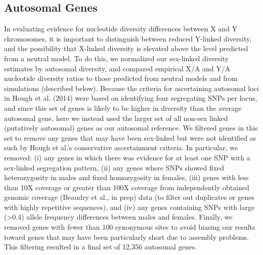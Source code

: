 \documentclass[9pt,twocolumn,twoside]{gsajnl}
\begin{document}
\subsection*{Autosomal Genes}
In evaluating evidence for nucleotide diversity differences between X and Y chromosomes, it is important to distinguish between reduced Y-linked diversity, and the possibility that X-linked diversity is elevated above the level predicted from a neutral model. To do this, we normalized our sex-linked diversity estimates by autosomal diversity, and compared empirical X/A and Y/A nucleotide diversity ratios to those predicted from neutral models and from simulations (described below). Because the criteria for ascertaining autosomal loci in Hough et al. (2014) were based on identifying four segregating SNPs per locus, and since this set of genes is likely to be higher in diversity than the average autosomal gene, here we instead used the larger set of all non-sex linked (putatively autosomal) genes as our autosomal reference. We filtered genes in this set to remove any genes that may have been sex-linked but were not identified as such by Hough et al.'s conservative ascertainment criteria. In particular, we removed: (i) any genes in which there was evidence for at least one SNP with a sex-linked segregation pattern, (ii) any genes where SNPs showed fixed heterozygosity in males and fixed homozygosity in females, (iii) genes with less than 10X coverage or greater than 100X coverage from independently obtained genomic coverage (Beaudry et al., in prep) data (to filter out duplicates or genes with highly repetitive sequences), and (iv) any genes containing SNPs with large (>0.4) allele frequency differences between males and females. Finally, we removed genes with fewer than 100 synonymous sites to avoid biasing our results toward genes that may have been particularly short due to assembly problems. This filtering resulted in a final set of 12,356 autosomal genes.
\end{document}
